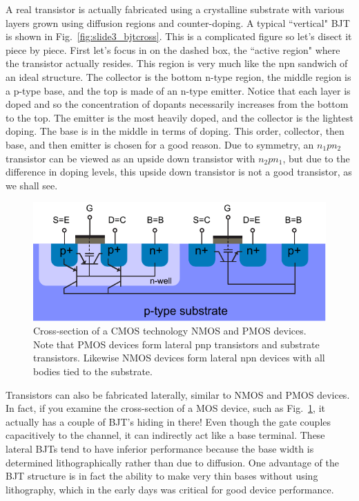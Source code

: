 A real transistor is actually fabricated using a crystalline substrate with various layers grown using diffusion regions and counter-doping.  A typical ``vertical" BJT is shown in Fig.~\ref{fig:slide3_bjtcross}.  This is a complicated figure so let's disect it piece by piece.   First let's focus in on the dashed box, the ``active region" where the transistor actually resides.  This region is very much like the npn sandwich of an ideal structure.  The collector is the bottom n-type region, the middle region is a p-type base, and the top is made of an n-type emitter.  Notice that each layer is doped and so the concentration of dopants necessarily increases from the bottom to the top. The emitter is the most heavily doped, and the collector is the lightest doping. The base is in the middle in terms of doping.  This order, collector, then base, and then emitter is chosen for a good reason.  Due to symmetry, an $n_1 p n_2$ transistor can be viewed as an upside down transistor with $n_2 p n_1$, but due to the difference in doping levels, this upside down transistor is not a good transistor, as we shall see.  


\begin{figure}[tb]
\begin{center}
\includegraphics[width=.75\columnwidth]{mos_bjt}
\end{center}
\caption{Cross-section of a CMOS technology NMOS and PMOS devices.  Note that PMOS devices form lateral pnp transistors and substrate transistors.  Likewise NMOS devices form lateral npn devices with all bodies tied to the substrate. } \label{fig:mos_bjt}
\end{figure}

Transistors can also be fabricated laterally, similar to NMOS and PMOS devices.  In fact, if you examine the cross-section of a MOS device, such as Fig.~\ref{fig:mos_bjt}, it actually has a couple of BJT's hiding in there!  Even though the gate couples capacitively to the channel, it can indirectly act like a base terminal.  These lateral BJTs tend to have inferior performance because the base width is determined lithographically rather than due to diffusion. One advantage of the BJT structure is in fact the ability to make very thin bases without using lithography, which in the early days was critical for good device performance.



